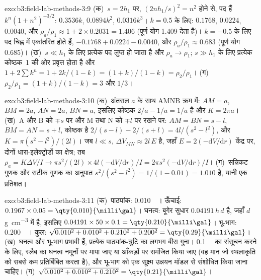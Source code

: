 \begin{solution}{exo:b3:field-lab-methods-3:9}
(क)~$s = 2h_1$ पर, $(2nh_1/s)^2 = n^2$ होने से, पद हैं $k^n(1 +
n^2)^{-3/2}$: $0.3536k$, $0.0894k^2$, $0.0316k^3$। $k = 0.5$ के लिए:
$\num{0.1768}$, $\num{0.0224}$, $\num{0.0040}$, और $\rho_a/\rho_1 \approx
1 + 2\times0.2031 = \num{1.406}$ (पूर्ण योग \num{1.409} देता है)। $k
= -0.5$ के लिए पद चिह्न में एकांतरित होते हैं, $-0.1768 + 0.0224 - 0.0040$, और
$\rho_a/\rho_1 \approx \num{0.683}$ (पूर्ण योग \num{0.685})। (ख)~$s \ll
h_1$ के लिए प्रत्येक पद लुप्त हो जाता है और $\rho_a \to \rho_1$; $s \gg h_1$ के लिए प्रत्येक
कोष्ठक~1 की ओर प्रवृत्त होता है और $1 + 2\sum k^n = 1 + 2k/(1 - k) = (1 + k)/(1 -
k) = \rho_2/\rho_1$। (ग)~$\rho_2/\rho_1 = (1 + k)/(1 - k) = 3$ और $1/3$।
\end{solution}

\begin{solution}{exo:b3:field-lab-methods-3:10}
(क)~अंतराल $a$ के साथ AMNB क्रम में: $AM = a$, $BM = 2a$, $AN = 2a$,
$BN = a$, इसलिए कोष्ठक $2/a - 1/a = 1/a$ है और $K = 2\pi a$।
(ख)~A और B को $\mp s$ पर और M तथा N को $\mp l$ पर रखने पर: $AM = BN = s - l$,
$BM = AN = s + l$, कोष्ठक है $2/(s - l) - 2/(s + l) = 4l/(s^2 -
l^2)$, और $K = \pi(s^2 - l^2)/(2l)$। जब $l \ll s$, $\Delta V_{MN}
\approx 2l\,E$ है, जहाँ $E = 2(-\mathrm{d}V/\mathrm{d}r)$ केंद्र पर,
दोनों धारा-इलेक्ट्रोडों का क्षेत्र; तब $\rho_a = K\Delta V/I \to
\pi s^2/(2l)\times 4l(-\mathrm{d}V/\mathrm{d}r)/I = 2\pi s^2(-
\mathrm{d}V/\mathrm{d}r)/I$। (ग)~सन्निकट गुणक और सटीक गुणक का अनुपात
$s^2/(s^2 - l^2) = 1/(1 - 0.01) = 1.010$ है, यानी एक प्रतिशत।
\end{solution}

\begin{solution}{exo:b3:field-lab-methods-3:11}
(क)~पाठ्यांक: \qty{0.010}{\milli\gal}। ऊँचाई:
$0.1967\times0.05 = \qty{0.010}{\milli\gal}$। घनत्व: बूगेर
सुधार $0.04191\,h\,d$ है, जहाँ $d$ \unit{g.cm^{-3}} में है, इसलिए
$0.04191\times50\times0.1 = \qty{0.210}{\milli\gal}$। भू-भाग:
\qty{0.200}{\milli\gal}। कुल: $\sqrt{0.010^2 + 0.010^2 + 0.210^2 +
0.200^2} = \qty{0.29}{\milli\gal}$। (ख)~घनत्व और भू-भाग
प्रभावी हैं, प्रत्येक पाठ्यांक-त्रुटि का लगभग बीस गुना।
\qty{0.1}{\milli\gal} का संसूचन करने के लिए, स्लैब का घनत्व नमूनों पर मापा जाए
या आँकड़ों पर समंजित किया जाए (वह मान जो स्थलाकृति को सबसे कम
प्रतिबिंबित करता है), और भू-भाग को एक सूक्ष्म उन्नयन मॉडल से संशोधित किया जाना चाहिए।
(ग)~$\sqrt{0.010^2 + 0.010^2 + 0.210^2} = \qty{0.21}{\milli\gal}$।
\end{solution}

